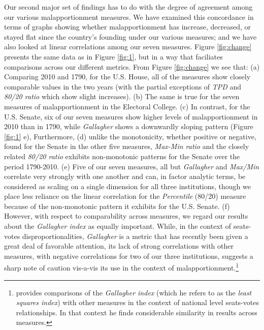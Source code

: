 Our second major set of findings has to do with the degree of agreement among our various malapportionment measures. We have examined this concordance in terms of graphs showing whether malapportionment has increase, decreased, or stayed flat since the country's founding under our various measures; and we have also looked at linear correlations among our seven measures. Figure \ref{fig:change} presents the same data as in Figure \ref{fig:1}, but in a way that faciliates comparisons across our different metrics. From Figure \ref{fig:change} we see that: (a) Comparing 2010 and 1790, for the U.S. House, all of the measures show closely comparable values in the two years (with the partial exceptions of \textit{TPD} and \textit{80/20 ratio} which show slight increases). (b) The same is true for the seven measures of malapportionment in the Electoral College. (c) In contrast, for the U.S. Senate, six of our seven measures show higher levels of malapportionment in 2010 than in 1790, while \textit{Gallagher} shows a downwardly sloping pattern (Figure \ref{fig:1} e), Furthermore, (d) unlike the monotonicity, whether positive or negative, found for the Senate in the other five measures, \textit{Max-Min ratio} and the closely related \textit{80/20 ratio} exhibits non-monotonic patterns for the Senate over the period 1790-2010. (e) Five of our seven measures, all but \textit{Gallagher} and \textit{Max/Min} correlate very strongly with one another and can, in factor analytic terms, be considered as scaling on a single dimension for all three institutions, though we place less reliance on the linear correlation for the \textit{Percentile} (80/20) measure because of the non-monotonic pattern it exhibits for the U.S. Senate. (f) However, with respect to comparability across measures, we regard our results about the \textit{Gallagher index} as equally important. While, in the context of seats-votes disproportionalities, \textit{Gallagher} is a metric that has recently been given a great deal of favorable attention, its lack of strong correlations with other measures, with negative correlations for two of our three institutions, suggests a sharp note of caution vis-a-vis its use in the context of malapportionment.\footnote{\citet[][]{Gallagher1991} provides comparisons of the \textit{Gallagher index} (which he refers to as the \textit{least squares index}) with other measures in the context of national level seats-votes relationships. In that context he finds considerable similarity in results across measures.}



